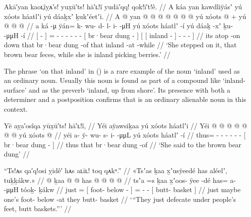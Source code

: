 \ex\label{ex:89-4-step-dung-picking-berries}%
%
\begingl
	\glpreamble	Akā′yan kaoʟ̣îỵᴀ′s! yux̣ū′ts! hā′ʟ!î yudā′qq! qok!ī′t!ê. //
	\glpreamble	A káa yan kawdliÿásʼ yú xóots háatlʼi yú dáaḵxʼ ḵukʼéetʼi. //
	\gla	{} A  @ {} {}
		yan @  @ {} @ {} @ {} @ {} @ {} @ {}
		{} yú xóots  @ {} {} +
		{} {} yú  @ {} {}
			 @ {} @ {} {} {} //
	\glb	{} a ká -μ {}
		ÿán= k- wu- d- l- i-  -μH
		{} yú xóots háatlʼ -í {}
		{} {} yú dáaḵ -xʼ {} 
			ḵu-  -μμH -í {} //
	\glc	{}[   - {}]
		= - - - - -  -
		{}[  br·bear dung - {}]
		{}[ {}[  inland - {}]
			-  - - {}] //
	\gld	{} its atop -on {}
		down  {} {} {} {} {} {}
		{} that br·bear dung -of {}
		{} {} that inland -at {}
			 {} {} -while {} //
	\glft	‘She stepped on it, that brown bear feces, while she is inland picking berries.’
		//
\endgl
\xe

The phrase  ‘on that inland’ in (\lastx) is a rare example of the noun  ‘inland’ used as an ordinary noun.
Usually this noun is found as part of a compound like  ‘inland-surface’ and as the preverb  ‘inland, up from shore’.
Its presence with both a determiner  and a postposition  confirms that  is an ordinary alienable noun in this context.

\ex\label{ex:89-5-said-to-the-dung}%
%
\begingl
	\glpreamble	Yē aỵa′osîqa yūx̣ū′ts! hā′ʟ!î, //
	\glpreamble	Yéi aÿawsiḵaa yú xóots háatlʼi //
	\gla	Yéi @  @ {} @ {} @ {} @ {} @ {} @ {}
		{} yú xóots  @ {} {} //
	\glb	yéi a- ÿ- wu- s- i-  -μμL
		{} yú xóots háatlʼ -í {} //
	\glc	thus= - - - - -  -
		{}[  br·bear dung - {}] //
	\gld	thus  {} {} {} {} {} {}
		{} that br·bear dung -of {} //
	\glft	‘She said to the brown bear dung’
		//
\endgl
\xe

\ex\label{ex:89-6-basket-butts}%
%
\begingl
	\glpreamble	“Ts!ᴀs qa′q!osi ỵidê′ hᴀs aʟīʟ! toq qᴀkᵘ.” //
	\glpreamble	«\!Tsʼas ḵaa x̱ʼusÿeedé has aléelʼ, tuḵḵákw.\!» //
	\gla	{} @ {} 
		{} ḵaa  @ {} @ {} {}
		has @  @ {} @ {}
		{}  @ {} {} //
	\glb	\pqp{}tsʼa =s
		{} ḵaa x̱ʼoos- ÿee -dé {}
		has= a-  -μμH
		{} tóoḵ- ḵákw {} //
	\glc	\pqp{}just =
		{}[  foot- below - {}]
		= -  -
		{}[ butt- basket {}] //
	\gld	\pqp{}just \•maybe
		{} one’s foot- below -at {}
		they  {} {}
		{} butt- basket {} //
	\glft	‘“They just defecate under people’s feet, butt baskets.”’
		//
\endgl
\xe

